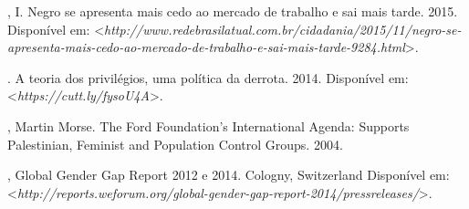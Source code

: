 \begin{Parskip}
, I. Negro se apresenta mais cedo ao mercado de trabalho e sai mais
tarde. 2015.
Disponível em: \textless{}\emph{http://www.redebrasilatual.com.br/cidadania/2015/11/negro-se-apresenta-mais-cedo-ao-mercado-de-trabalho-e-sai-mais-tarde-9284.html}\textgreater{}.

. A teoria dos privilégios, uma política da derrota. 2014.
Disponível em: \textless{}\emph{https://cutt.ly/fysoU4A}\textgreater{}.

, Martin Morse. The Ford Foundation's International Agenda:
Supports Palestinian, Feminist and Population Control Groups. 2004.

, Global Gender Gap Report 2012 e 2014. Cologny,
Switzerland
Disponível em: \textless{}\emph{http://reports.weforum.org/global-gender-gap-report-2014/pressreleases/}\textgreater{}.
\end{Parskip}